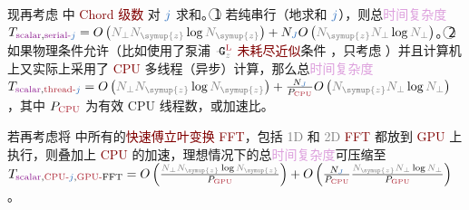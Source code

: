 {\four} 现再考虑  中 \textcolor{Maroon}{Chord 级数} 对 $\textcolor{NavyBlue}{j}$ 求和。\textcircled{1} 若纯串行（地求和 $\textcolor{NavyBlue}{j}$），则总\textcolor{Plum}{时间复杂度} $T_{\text{\textcolor{Plum}{scalar}},\text{\textcolor{Plum}{serial-}}\textcolor{NavyBlue}{j}} = O \left( \textcolor{gray}{N_\perp} \textcolor{gray}{N_{\symup{z}}} \log \textcolor{gray}{N_{\symup{z}}} \right) + N_{\textcolor{NavyBlue}{J}} O \left( \textcolor{gray}{N_{\symup{z}}} \textcolor{gray}{N_\perp} \log \textcolor{gray}{N_\perp} \right)$。\textcircled{2} 如果物理条件允许（比如使用了\textcolor{NavyBlue}{泵浦} $\xint{\mathcolor{gray}{-}}{16}{\mathtt{G}}^{\text{\textcolor{Maroon}{L}}}_{\mathcolor{gray}{z}}$ \textcolor{Maroon}{未耗尽近似}条件 ，只考虑 ）并且计算机上又实际上采用了 \textcolor{Maroon}{CPU} 多线程（异步）计算，那么总\textcolor{Plum}{时间复杂度} $T_{\text{\textcolor{Plum}{scalar}},\text{\textcolor{Maroon}{thread-}}\textcolor{NavyBlue}{j}} = O \left( \textcolor{gray}{N_\perp} \textcolor{gray}{N_{\symup{z}}} \log \textcolor{gray}{N_{\symup{z}}} \right) + \frac{N_{\textcolor{NavyBlue}{J}}}{P_{\text{\textcolor{Maroon}{CPU}}}} O \left( \textcolor{gray}{N_{\symup{z}}} \textcolor{gray}{N_\perp} \log \textcolor{gray}{N_\perp} \right)$，其中 $P_{\text{\textcolor{Maroon}{CPU}}}$ 为有效 CPU 线程数，或加速比。

{\five} 若再考虑将  中所有的\textcolor{Maroon}{快速傅立叶变换 FFT}，包括 \textcolor{gray}{1D} 和 \textcolor{gray}{2D} \textcolor{Maroon}{FFT} 都放到 \textcolor{Maroon}{GPU} 上执行，则叠加上 \textcolor{Maroon}{CPU} 的加速，理想情况下的总\textcolor{Plum}{时间复杂度}可压缩至 $T_{\text{\textcolor{Plum}{scalar}},\text{\textcolor{Maroon}{CPU-}}\textcolor{NavyBlue}{j},\text{\textcolor{Maroon}{GPU-}}\text{FFT}} = O \left( \frac{\textcolor{gray}{N_\perp} \textcolor{gray}{N_{\symup{z}}} \log \textcolor{gray}{N_{\symup{z}}}}{P_{\text{\textcolor{Maroon}{GPU}}}} \right) + O \left( \frac{N_{\textcolor{NavyBlue}{J}}}{P_{\text{\textcolor{Maroon}{CPU}}}} \frac{\textcolor{gray}{N_{\symup{z}}} \textcolor{gray}{N_\perp} \log \textcolor{gray}{N_\perp}}{P_{\text{\textcolor{Maroon}{GPU}}}} \right)$。

